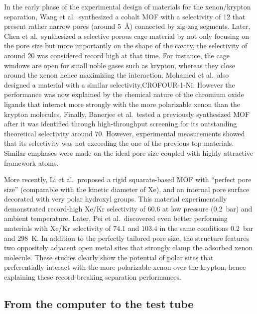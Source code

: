 \documentclass[main.tex]{subfiles}
\begin{document}
In the early phase of the experimental design of materials for the xenon/krypton separation, Wang et al.\ synthesized a cobalt MOF  with a selectivity of 12 that present rather narrow pores (around \SI{5}{\angstrom}) connected by zig-zag segments.\autocite{Wang_2014} Later, Chen et al.\ synthesized a selective porous cage material by not only focusing on the pore size but more importantly on the shape of the cavity, the selectivity of around $20$ was considered record high at that time. For instance, the cage windows are open for small noble gases such as krypton, whereas they close around the xenon hence maximizing the interaction.\autocite{Chen_2014} Mohamed et al.\ also designed a material with a similar selectivity,CROFOUR-1-Ni. However the performance was now explained by the chemical nature of the chromium oxide ligands that interact more strongly with the more polarizable xenon than the krypton molecules.\autocite{Mohamed_2016} Finally, Banerjee et al.\ tested a previously synthesized\autocite{KAXQIL} MOF after it was identified through high-throughput screening\autocite{Simon_2015} for its outstanding theoretical selectivity around $70$. However, experimental measurements showed that its selectivity was not exceeding the one of the previous top materials. Similar emphases were made on the ideal pore size coupled with highly attractive framework atoms.\autocite{Banerjee_2016}

More recently, Li et al.\ proposed a rigid squarate-based MOF with ``perfect pore size'' (comparable with the kinetic diameter of Xe), and an internal pore surface decorated with very polar hydroxyl groups. This material experimentally demonstrated record-high Xe/Kr selectivity of $60.6$ at low pressure (\SI{0.2}{\bar}) and ambient temperature.\autocite{Li_2019} Later, Pei et al.\ discovered even better performing materials with Xe/Kr selectivity of $74.1$ and $103.4$ in the same conditions \SI{0.2}{\bar} and \SI{298}{\kelvin}. In addition to the perfectly tailored pore size, the structure features two oppositely adjacent open metal sites that strongly clamp the adsorbed xenon molecule.\autocite{Pei_2022} These studies clearly show the potential of polar sites that preferentially interact with the more polarizable xenon over the krypton, hence explaining these record-breaking separation performances. 

\subsection{From the computer to the test tube}
\end{document}
